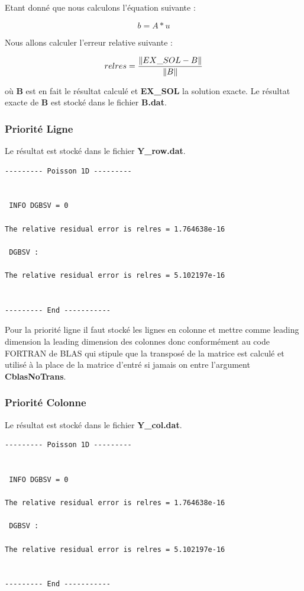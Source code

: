 \documentclass[11pt]{article}
\DeclarePairedDelimiter{\norm}{\lVert}{\rVert}
\begin{document}
Etant donné que nous calculons l'équation suivante :

\begin{equation*}
b = A * u
\end{equation*}

Nous allons calculer l'erreur relative suivante :

\begin{equation*}
relres = \frac{\norm{EX\_SOL - B}}{\norm{B}}
\end{equation*}

où \textbf{B} est en fait le résultat calculé et \textbf{EX\_SOL} la
solution exacte.\newline
Le résultat exacte de \textbf{B} est stocké dans le fichier \textbf{B.dat}.

\subsubsection{Priorité Ligne}

Le résultat est stocké dans le fichier \textbf{Y\_row.dat}.\newline

\begin{lstlisting}
--------- Poisson 1D ---------


 INFO DGBSV = 0

The relative residual error is relres = 1.764638e-16

 DGBSV :

The relative residual error is relres = 5.102197e-16


--------- End -----------
\end{lstlisting}

Pour la priorité ligne il faut stocké les lignes en colonne et mettre
comme leading dimension la leading dimension des colonnes donc
conformément au code FORTRAN de BLAS qui stipule que la transposé de
la matrice est calculé et utilisé à la place de la matrice d'entré si
jamais on entre l'argument \textbf{CblasNoTrans}.

\subsubsection{Priorité Colonne}

Le résultat est stocké dans le fichier \textbf{Y\_col.dat}.

\begin{lstlisting}
--------- Poisson 1D ---------


 INFO DGBSV = 0

The relative residual error is relres = 1.764638e-16

 DGBSV :

The relative residual error is relres = 5.102197e-16


--------- End -----------
\end{lstlisting}
\end{document}
